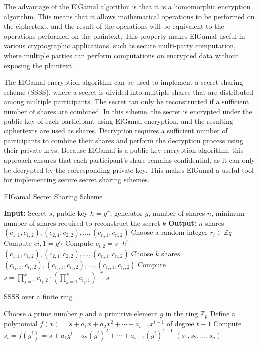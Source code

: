 \documentclass[twocolumn]{article}
\begin{document}
The advantage of the ElGamal algorithm is that it is a homomorphic encryption algorithm. This means that it allows mathematical operations to be performed on the ciphertext, and the result of the operations will be equivalent to the operations performed on the plaintext. This property makes ElGamal useful in various cryptographic applications, such as secure multi-party computation, where multiple parties can perform computations on encrypted data without exposing the plaintext.

The ElGamal encryption algorithm can be used to implement a secret sharing scheme (SSSS), where a secret is divided into multiple shares that are distributed among multiple participants. The secret can only be reconstructed if a sufficient number of shares are combined. In this scheme, the secret is encrypted under the public key of each participant using ElGamal encryption, and the resulting ciphertexts are used as shares. Decryption requires a sufficient number of participants to combine their shares and perform the decryption process using their private keys. Because ElGamal is a public-key encryption algorithm, this approach ensures that each participant's share remains confidential, as it can only be decrypted by the corresponding private key. This makes ElGamal a useful tool for implementing secure secret sharing schemes.


\begin{algorithm}[h]
\caption{ElGamal Secret Sharing Scheme}
\label{ElGamal SSSS}
\begin{algorithmic}[1]
\State \textbf{Input:} Secret $s$, public key $h = g^x$, generator $g$, number of shares $n$, minimum number of shares required to reconstruct the secret $k$
\State \textbf{Output:} $n$ shares $(c_{1,1}, c_{1,2}), (c_{2,1}, c_{2,2}), \dots, (c_{n,1}, c_{n,2})$
\State Choose a random integer $r_i \in \mathbb{Z}q$
\State Compute $c{i,1} = g^{r_i}$
\State Compute $c_{i,2} = s\cdot h^{r_i}$
\EndFor
\State \Return $(c_{1,1}, c_{1,2}), (c_{2,1}, c_{2,2}), \dots, (c_{n,1}, c_{n,2})$
\EndProcedure
{}
\State Choose $k$ shares $(c_{i_1,1}, c_{i_1,2}), (c_{i_2,1}, c_{i_2,2}), \dots, (c_{i_k,1}, c_{i_k,2})$
\State Compute $s = \prod\limits_{j=1}^k c_{i_j,2} \cdot \left(\prod\limits_{j=1}^k c_{i_j,1}\right)^{-x}$
\State \Return $s$
\EndProcedure
\end{algorithmic}
\end{algorithm}


\begin{algorithm}
  \caption{SSSS over a finite ring}
  \label{FR SSSS}
\begin{algorithmic}[1]
\State Choose a prime number $p$ and a primitive element $g$ in the ring $\mathbb{Z}_p$
\State Define a polynomial $f(x) = s + a_1 x + a_2 x^2 + \cdots + a_{t-1} x^{t-1}$ of degree $t-1$
\State Compute $s_i = f(g^i) = s + a_1 g^i + a_2 (g^i)^2 + \cdots + a_{t-1} (g^i)^{t-1}$
\EndFor
\State \Return $(s_1, s_2, \ldots, s_n)$
\EndProcedure
\end{algorithmic}
\end{algorithm}
\end{document}

